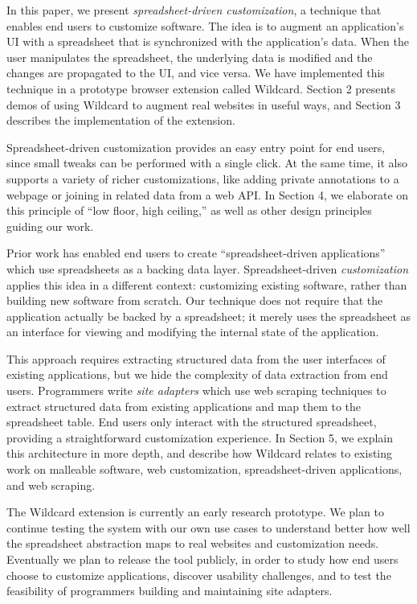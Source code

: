 \documentclass[english,submission]{programming}
\begin{document}
In this paper, we present \emph{spreadsheet-driven customization}, a
technique that enables end users to customize software. The idea is to
augment an application's UI with a spreadsheet that is synchronized with
the application's data. When the user manipulates the spreadsheet, the
underlying data is modified and the changes are propagated to the UI,
and vice versa. We have implemented this technique in a prototype
browser extension called Wildcard. Section 2 presents demos of using
Wildcard to augment real websites in useful ways, and Section 3
describes the implementation of the extension.

Spreadsheet-driven customization provides an easy entry point for end
users, since small tweaks can be performed with a single click. At the
same time, it also supports a variety of richer customizations, like
adding private annotations to a webpage or joining in related data from
a web API. In Section 4, we elaborate on this principle of ``low floor,
high ceiling,'' as well as other design principles guiding our work.

Prior work \autocite{mccutchen2016,benson2014,chang2014} has enabled end
users to create ``spreadsheet-driven applications'' which use
spreadsheets as a backing data layer. Spreadsheet-driven
\emph{customization} applies this idea in a different context:
customizing existing software, rather than building new software from
scratch. Our technique does not require that the application actually be
backed by a spreadsheet; it merely uses the spreadsheet as an interface
for viewing and modifying the internal state of the application.

This approach requires extracting structured data from the user
interfaces of existing applications, but we hide the complexity of data
extraction from end users. Programmers write \emph{site adapters} which
use web scraping techniques to extract structured data from existing
applications and map them to the spreadsheet table. End users only
interact with the structured spreadsheet, providing a straightforward
customization experience. In Section 5, we explain this architecture in
more depth, and describe how Wildcard relates to existing work on
malleable software, web customization, spreadsheet-driven applications,
and web scraping.

The Wildcard extension is currently an early research prototype. We plan
to continue testing the system with our own use cases to understand
better how well the spreadsheet abstraction maps to real websites and
customization needs. Eventually we plan to release the tool publicly, in
order to study how end users choose to customize applications, discover
usability challenges, and to test the feasibility of programmers
building and maintaining site adapters.
\end{document}
